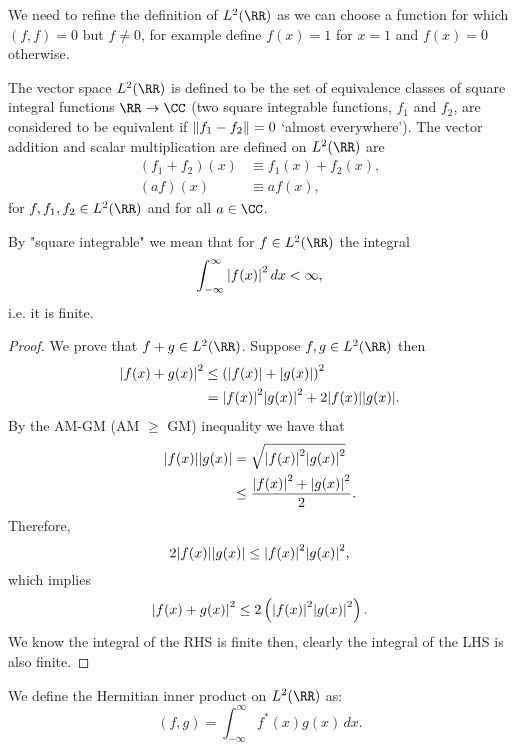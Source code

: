 \documentclass[12pt, a4paper]{article}
\begin{document}
\begin{mdremark}
    We need to refine the definition of \(L^2(\RR)\) as we can choose a function for which \((f,f)=0\) but \(f \neq 0\), for example define \(f(x)=1\) for \(x=1\) and \(f(x)=0\) otherwise.
\end{mdremark}

\begin{definition}
    The vector space \(L^2(\RR)\) is defined to be the set of equivalence classes of square integral functions \(\RR \to \CC\) (two square integrable functions, \(f_1\) and \(f_2\), are considered to be equivalent if \(\norm{f_1-f_2}=0\) `almost everywhere'). The vector addition and scalar multiplication are defined on \(L^2(\RR)\) are 
    \[\begin{aligned}
        (f_1+f_2)(x) &\equiv f_1(x) + f_2(x), \\
        (af)(x) &\equiv af(x),
    \end{aligned}\]
    for \(f,f_1,f_2 \in L^2(\RR)\) and for all \(a \in \CC\).
\end{definition}

\begin{mdremark}
    By "square integrable" we mean that for \(f \in L^2(\RR)\) the integral 
    \[\int_{-\infty}^{\infty} \abs{f(x)}^2 \, dx < \infty,\]
    i.e. it is finite.
\end{mdremark}

\begin{proof}
    We prove that \(f+g \in L^2(\RR)\). Suppose \(f,g \in L^2(\RR)\) then 
    \[\begin{aligned}
        \abs{f(x)+g(x)}^2 &\leq \left( \abs{f(x)}+\abs{g(x)} \right)^2 \\
        &= \abs{f(x)}^2 \abs{g(x)}^2 + 2\abs{f(x)} \abs{g(x)}.
    \end{aligned}\]
    By the AM-GM (AM \(\geq\) GM) inequality we have that 
    \[\begin{aligned}
        \abs{f(x)} \abs{g(x)} &= \sqrt{\abs{f(x)}^2 \abs{g(x)}^2} \\
        &\leq \frac{\abs{f(x)}^2 + \abs{g(x)}^2}{2}.
    \end{aligned}\]
    Therefore, 
    \[2\abs{f(x)}\abs{g(x)} \leq \abs{f(x)}^2 \abs{g(x)}^2,\]
    which implies 
    \[\abs{f(x)+g(x)}^2 \leq 2\left( \abs{f(x)}^2 \abs{g(x)}^2 \right).\]
    We know the integral of the RHS is finite then, clearly the integral of the LHS is also finite.
\end{proof}

\begin{definition}
    We define the Hermitian inner product on \(L^2(\RR)\) as:
    \[(f,g) = \int_{-\infty}^{\infty} f^*(x) g(x) \, dx.\]
\end{definition}
\end{document}
